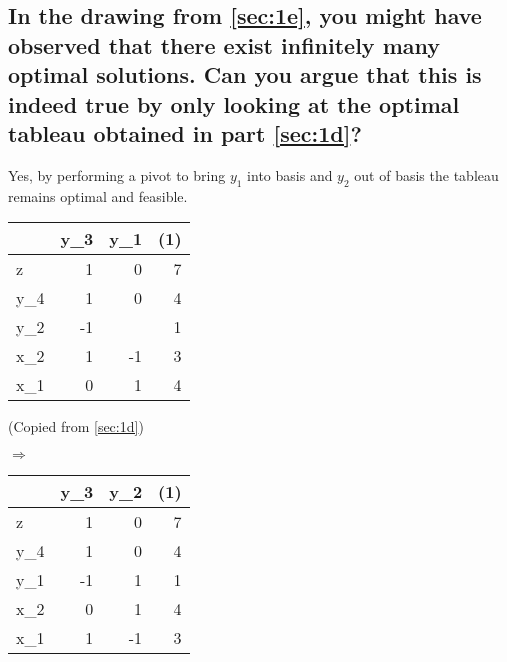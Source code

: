 \documentclass[12pt, a4]{article}
\newcommand{\lightgray}{black!30}
\newcommand{\plotDomain}{-1:8}
\newcommand{\addPlotLDownCoords}[1]{
	\addplot[mark=none, domain=\plotDomain, color=\lightgray,
	decoration={border,segment length=1mm,amplitude=1.5mm,angle=-135},
	postaction={decorate}
	] coordinates {#1};
	\addplot[mark=none, domain=\plotDomain] coordinates {#1};
}
\newcommand{\addPlotLDown}[1]{
	\addplot[mark=none, domain=\plotDomain, color=\lightgray,
	decoration={border,segment length=1mm,amplitude=1.5mm,angle=-135},
	postaction={decorate}
	] {#1};
	\addplot[mark=none, domain=\plotDomain] {#1};
}
\newcommand{\addPlotRUpCoords}[1]{
	\addplot[mark=none, domain=\plotDomain, color=\lightgray,
	decoration={border,segment length=1mm,amplitude=1.5mm,angle=135},
	postaction={decorate}
	] coordinates {#1};
	\addplot[mark=none, domain=\plotDomain] coordinates {#1};
}
\newcommand{\addPlotRUp}[1]{
	\addplot[mark=none, domain=\plotDomain, color=\lightgray,
	decoration={border,segment length=1mm,amplitude=1.5mm,angle=135},
	postaction={decorate}
	] {#1};
	\addplot[mark=none, domain=\plotDomain] {#1};
}
\begin{document}
{\begin{center}
\end{center}

\subsection{In the drawing from \ref{sec:1e}, you might have observed that there exist infinitely many optimal solutions. Can you argue that this is indeed true by only looking at the optimal tableau obtained in part \ref{sec:1d}?}

Yes, by performing a pivot to bring $y_1$ into basis and $y_2$ out of basis the tableau remains optimal and feasible.

\begin{minipage}{.5\textwidth}
	\centering
	\begin{tabular}{L|RR||R}
		&  y_3 & y_1 & (1)  \\
		\hline
		z   & 1 & 0 & 7 \\
		\hline
		y_4 & 1 & 0 & 4 \\
		y_2 &-1 &  & 1 \\
		x_2 & 1 &-1 & 3 \\
		x_1 & 0 & 1 & 4 \\
	\end{tabular}

(Copied from \ref{sec:1d})
\end{minipage}
$\Rightarrow$
\begin{minipage}{.5\textwidth}
	\centering
	\begin{tabular}{L|RR||R}
		&  y_3 & y_2 & (1)  \\
		\hline
		z   & 1 & 0 & 7 \\
		\hline
		y_4 & 1 & 0 & 4 \\
		y_1 &-1 & 1 & 1 \\
		x_2 & 0 & 1 & 4 \\
		x_1 & 1 &-1 & 3 \\
	\end{tabular}
\end{minipage}

}
\end{document}

